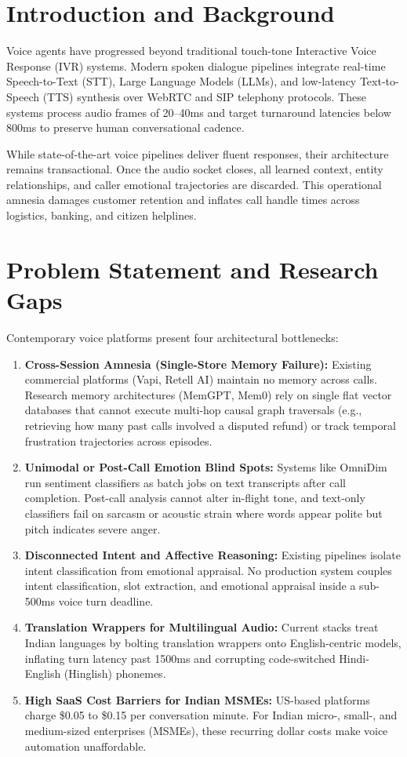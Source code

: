 \documentclass[12pt,a4paper]{article}
\begin{document}
\section{Introduction and Background}
Voice agents have progressed beyond traditional touch-tone Interactive Voice Response (IVR) systems. Modern spoken dialogue pipelines integrate real-time Speech-to-Text (STT), Large Language Models (LLMs), and low-latency Text-to-Speech (TTS) synthesis over WebRTC and SIP telephony protocols. These systems process audio frames of 20--40ms and target turnaround latencies below 800ms to preserve human conversational cadence.

While state-of-the-art voice pipelines deliver fluent responses, their architecture remains transactional. Once the audio socket closes, all learned context, entity relationships, and caller emotional trajectories are discarded. This operational amnesia damages customer retention and inflates call handle times across logistics, banking, and citizen helplines.

\section{Problem Statement and Research Gaps}
Contemporary voice platforms present four architectural bottlenecks:

\begin{enumerate}[leftmargin=*]
    \item \textbf{Cross-Session Amnesia (Single-Store Memory Failure):} Existing commercial platforms (Vapi, Retell AI) maintain no memory across calls. Research memory architectures (MemGPT, Mem0) rely on single flat vector databases that cannot execute multi-hop causal graph traversals (e.g., retrieving how many past calls involved a disputed refund) or track temporal frustration trajectories across episodes.
    \item \textbf{Unimodal or Post-Call Emotion Blind Spots:} Systems like OmniDim run sentiment classifiers as batch jobs on text transcripts after call completion. Post-call analysis cannot alter in-flight tone, and text-only classifiers fail on sarcasm or acoustic strain where words appear polite but pitch indicates severe anger.
    \item \textbf{Disconnected Intent and Affective Reasoning:} Existing pipelines isolate intent classification from emotional appraisal. No production system couples intent classification, slot extraction, and emotional appraisal inside a sub-500ms voice turn deadline.
    \item \textbf{Translation Wrappers for Multilingual Audio:} Current stacks treat Indian languages by bolting translation wrappers onto English-centric models, inflating turn latency past 1500ms and corrupting code-switched Hindi-English (Hinglish) phonemes.
    \item \textbf{High SaaS Cost Barriers for Indian MSMEs:} US-based platforms charge \$0.05 to \$0.15 per conversation minute. For Indian micro-, small-, and medium-sized enterprises (MSMEs), these recurring dollar costs make voice automation unaffordable.
\end{enumerate}
\end{document}
